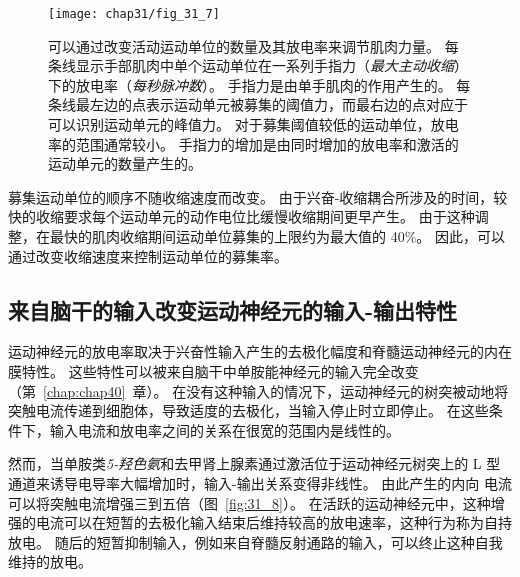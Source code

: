 \begin{figure}[htbp]
	\centering
	\texttt{[image: chap31/fig\_31\_7]}
	\caption{可以通过改变活动运动单位的数量及其放电率来调节肌肉力量。
	每条线显示手部肌肉中单个运动单位在一系列手指力（\textit{最大主动收缩}）下的放电率（\textit{每秒脉冲数}）。
	手指力是由单手肌肉的作用产生的。
	每条线最左边的点表示运动单元被募集的阈值力，而最右边的点对应于可以识别运动单元的峰值力。
	对于募集阈值较低的运动单位，放电率的范围通常较小。
	手指力的增加是由同时增加的放电率和激活的运动单元的数量产生的\cite{moritz2005discharge}。}
	\label{fig:31_7}
\end{figure}


募集运动单位的顺序不随收缩速度而改变。
由于兴奋-收缩耦合所涉及的时间，较快的收缩要求每个运动单元的动作电位比缓慢收缩期间更早产生。
由于这种调整，在最快的肌肉收缩期间运动单位募集的上限约为最大值的 40\%。
因此，可以通过改变收缩速度来控制运动单位的募集率。



\subsection{来自脑干的输入改变运动神经元的输入-输出特性}

运动神经元的放电率取决于兴奋性输入产生的去极化幅度和脊髓运动神经元的内在膜特性。
这些特性可以被来自脑干中单胺能神经元的输入完全改变（第~\ref{chap:chap40}~章）。
在没有这种输入的情况下，运动神经元的树突被动地将突触电流传递到细胞体，导致适度的去极化，当输入停止时立即停止。
在这些条件下，输入电流和放电率之间的关系在很宽的范围内是线性的。


然而，当单胺类\textit{5-羟色氨}和去甲肾上腺素通过激活位于运动神经元树突上的 L 型  通道来诱导电导率大幅增加时，输入-输出关系变得非线性。
由此产生的内向  电流可以将突触电流增强三到五倍（图~\ref{fig:31_8}）。
在活跃的运动神经元中，这种增强的电流可以在短暂的去极化输入结束后维持较高的放电速率，这种行为称为自持放电。
随后的短暂抑制输入，例如来自脊髓反射通路的输入，可以终止这种自我维持的放电。


